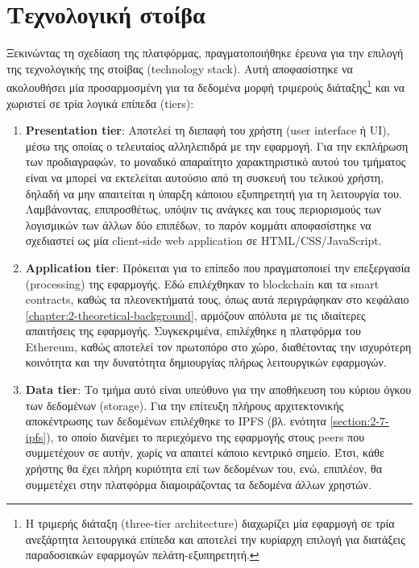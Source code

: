 \section{Τεχνολογική στοίβα} \label{section:3-2-technology-stack}

Ξεκινώντας τη σχεδίαση της πλατφόρμας, πραγματοποιήθηκε έρευνα για την επιλογή της τεχνολογικής της στοίβας (technology stack). Αυτή αποφασίστηκε να ακολουθήσει μία προσαρμοσμένη για τα δεδομένα μορφή τριμερούς διάταξης\footnote{Η τριμερής διάταξη (three-tier architecture) διαχωρίζει μία εφαρμογή σε τρία ανεξάρτητα λειτουργικά επίπεδα και αποτελεί την κυρίαρχη επιλογή για διατάξεις παραδοσιακών εφαρμογών πελάτη-εξυπηρετητή.} και να χωριστεί σε τρία λογικά επίπεδα (tiers):

\begin{enumerate}
    \item \textbf{Presentation tier}: Αποτελεί τη διεπαφή του χρήστη (user interface ή UI), μέσω της οποίας ο τελευταίος αλληλεπιδρά με την εφαρμογή. Για την εκπλήρωση των προδιαγραφών, το μοναδικό απαραίτητο χαρακτηριστικό αυτού του τμήματος είναι να μπορεί να εκτελείται αυτούσιο από τη συσκευή του τελικού χρήστη, δηλαδή να μην απαιτείται η ύπαρξη κάποιου εξυπηρετητή για τη λειτουργία του. Λαμβάνοντας, επιπροσθέτως, υπόψιν τις ανάγκες και τους περιορισμούς των λογισμικών των άλλων δύο επιπέδων, το παρόν κομμάτι αποφασίστηκε να σχεδιαστεί ως μία client-side web application σε HTML/CSS/JavaScript.

    \item \textbf{Application tier}: Πρόκειται για το επίπεδο που πραγματοποιεί την επεξεργασία (\textenglish{processing}) της εφαρμογής. Εδώ επιλέχθηκαν το blockchain και τα smart contracts, καθώς τα πλεονεκτήματά τους, όπως αυτά περιγράφηκαν στο κεφάλαιο \ref{chapter:2-theoretical-background}, αρμόζουν απόλυτα με τις ιδιαίτερες απαιτήσεις της εφαρμογής. Συγκεκριμένα, επιλέχθηκε η πλατφόρμα του Ethereum, καθώς αποτελεί τον πρωτοπόρο στο χώρο, διαθέτοντας την ισχυρότερη κοινότητα και την δυνατότητα δημιουργίας πλήρως λειτουργικών εφαρμογών.

    \item \textbf{Data tier}: Το τμήμα αυτό είναι υπεύθυνο για την αποθήκευση του κύριου όγκου των δεδομένων (storage). Για την επίτευξη πλήρους αρχιτεκτονικής αποκέντρωσης των δεδομένων επιλέχθηκε το IPFS (βλ. ενότητα \ref{section:2-7-ipfs}), το οποίο διανέμει το περιεχόμενο της εφαρμογής στους peers που συμμετέχουν σε αυτήν, χωρίς να απαιτεί κάποιο κεντρικό σημείο. Έτσι, κάθε χρήστης θα έχει πλήρη κυριότητα επί των δεδομένων του, ενώ, επιπλέον, θα συμμετέχει στην πλατφόρμα διαμοιράζοντας τα δεδομένα άλλων χρηστών.
\end{enumerate}

